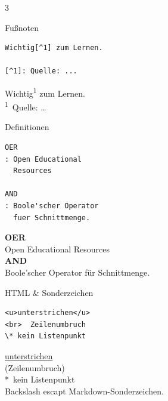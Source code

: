 \documentclass[a4paper,landscape,9pt]{extarticle}
\newcommand{\prevtxt}[1]{{\small #1}}
\begin{document}
\begin{multicols}{3}
\begin{mdcard}{Fußnoten}
\begin{lstlisting}[language=lia]
Wichtig[^1] zum Lernen.

[^1]: Quelle: ...
\end{lstlisting}
\tcblower
\prevtxt{Wichtig\textsuperscript{\textcolor{mdblue}{1}} zum Lernen.\\[3pt]
{\scriptsize \textsuperscript{1}~Quelle: \dots}}
\end{mdcard}

\begin{mdcard}{Definitionen}
\begin{lstlisting}[language=lia]
OER
: Open Educational
  Resources

AND
: Boole'scher Operator
  fuer Schnittmenge.
\end{lstlisting}
\tcblower
\prevtxt{\textbf{OER}\\
\hspace*{1em}Open Educational Resources\\[3pt]
\textbf{AND}\\
\hspace*{1em}Boole'scher Operator für Schnittmenge.}
\end{mdcard}

\begin{mdcard}{HTML \& Sonderzeichen}
\begin{lstlisting}[language=lia]
<u>unterstrichen</u>
<br>  Zeilenumbruch
\* kein Listenpunkt
\end{lstlisting}
\tcblower
\prevtxt{\underline{unterstrichen}\\
{\scriptsize\color{muted}(Zeilenumbruch)}\\
*~kein Listenpunkt\\[2pt]
{\scriptsize\color{muted}Backslash escapt Markdown-Sonderzeichen.}}
\end{mdcard}

\end{multicols}
\end{document}
